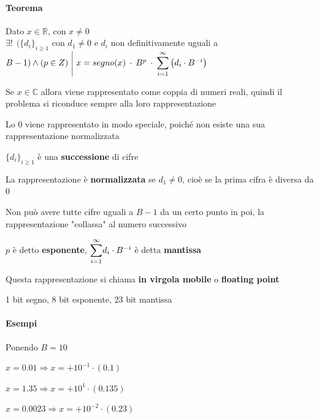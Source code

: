 \documentclass[10pt]{book}
\begin{document}
\paragraph{Teorema} Dato $x \in \mathbb{R}$, con $x \neq 0$\\$\exists!\:\:(\{d_i\}_{i \geq 1}$ con $d_1 \neq 0$ e $d_i$ non definitivamente uguali a $B - 1) \wedge (p \in Z) \:\:\vline\:\: x = segno(x)\:\cdot\:B^p\:\cdot\:\mathlarger{\sum_{i=1}^\infty}\left( d_i \cdot B^{-i}\right)$
\begin{list}{}{Considerazioni}
	\item Se $x \in \mathbb{C}$ allora viene rappresentato come coppia di numeri reali, quindi il problema si riconduce sempre alla loro rappresentazione
	\item Lo $0$ viene rappresentato in modo speciale, poiché non esiste una sua rappresentazione normalizzata
	\item $\{d_i\}_{i \geq 1}$ è una \textbf{successione} di cifre
	\item La rappresentazione è \textbf{normalizzata} se $d_1 \neq 0$, cioè se la prima cifra è diversa da 0
	\item Non può avere tutte cifre uguali a $B-1$ da un certo punto in poi, la rappresentazione "collassa" al numero successivo
	\item $p$ è detto \textbf{esponente}, $\mathlarger{\sum_{i=1}^\infty} d_i \cdot B^{-i}$ è detta \textbf{mantissa}
	\item Questa rappresentazione si chiama \textbf{in virgola mobile} o \textbf{floating point}
\end{list}
\begin{center}
1 bit segno, 8 bit esponente, 23 bit mantissa
\end{center} %
\pagebreak
\paragraph{Esempi} Ponendo $B = 10$
\begin{list}{}{}
	\item $x = 0.01 \Rightarrow x = +10^{-1}\cdot(0.1)$
	\item $x = 1.35 \Rightarrow x = +10^1\cdot(0.135)$
	\item $x = 0.0023 \Rightarrow x = +10^{-2}\cdot(0.23)$
\end{list}
\end{document}
